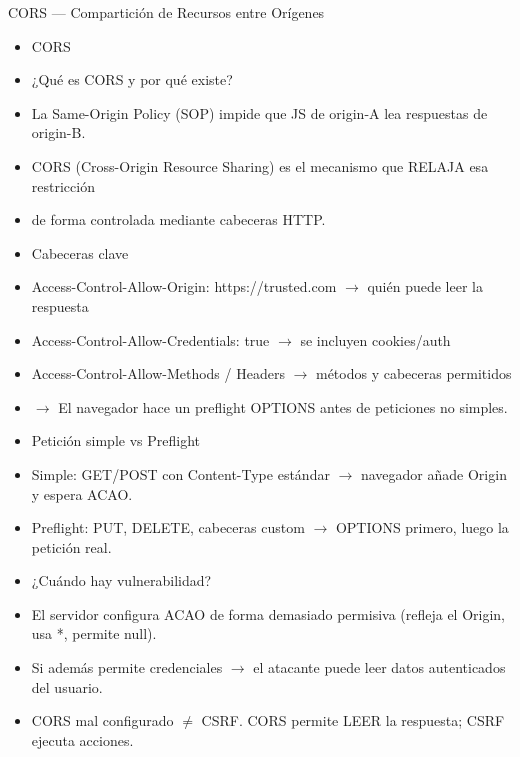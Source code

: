 \documentclass[aspectratio=169,10pt]{beamer}
\begin{document}
\begin{frame}[allowframebreaks]{CORS --- Compartición de Recursos entre Orígenes}
\small
  \begin{itemize}
  \item CORS
  \item ¿Qué es CORS y por qué existe?
  \item La Same-Origin Policy (SOP) impide que JS de origin-A lea respuestas de origin-B.
  \item CORS (Cross-Origin Resource Sharing) es el mecanismo que RELAJA esa restricción
  \item de forma controlada mediante cabeceras HTTP.
  \item Cabeceras clave
  \item Access-Control-Allow-Origin: https://trusted.com $\rightarrow$ quién puede leer la respuesta
  \item Access-Control-Allow-Credentials: true $\rightarrow$ se incluyen cookies/auth
  \item Access-Control-Allow-Methods / Headers $\rightarrow$ métodos y cabeceras permitidos
  \item $\rightarrow$ El navegador hace un preflight OPTIONS antes de peticiones no simples.
  \item Petición simple vs Preflight
  \item Simple: GET/POST con Content-Type estándar $\rightarrow$ navegador añade Origin y espera ACAO.
  \item Preflight: PUT, DELETE, cabeceras custom $\rightarrow$ OPTIONS primero, luego la petición real.
  \item ¿Cuándo hay vulnerabilidad?
  \item El servidor configura ACAO de forma demasiado permisiva (refleja el Origin, usa *, permite null).
  \item Si además permite credenciales $\rightarrow$ el atacante puede leer datos autenticados del usuario.
  \item CORS mal configurado $\neq$ CSRF. CORS permite LEER la respuesta; CSRF ejecuta acciones.
  \end{itemize}
\end{frame}
\end{document}
